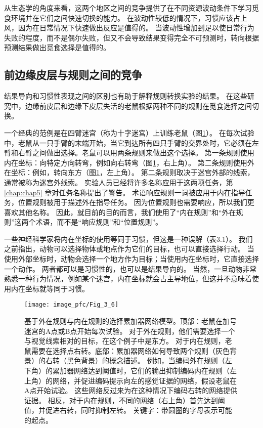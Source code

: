 从生态学的角度来看，这两个地区之间的竞争提供了在不同资源波动条件下学习觅食环境并在它们之间快速切换的能力。
在波动性较低的情况下，习惯应该占上风，因为在日常情况下快速做出反应是值得的。
当波动性增加到足以使日常行为失败的程度，而不是偶尔失败，但又不会导致结果变得完全不可预测时，转向根据预测结果做出觅食选择是值得的。\par



\subsection{前边缘皮层与规则之间的竞争}

结果导向和习惯性表现之间的区别也有助于解释规则转换实验的结果。
在这些研究中，边缘前皮层和边缘下皮层失活的老鼠根据两种不同的规则在觅食选择之间切换。\par


一个经典的范例是在四臂迷宫（称为十字迷宫）上训练老鼠（图\ref{fig:3_6}）。
在每次试验中，老鼠从一只手臂的末端开始，当它到达所有四只手臂的交界处时，它必须在左臂和右臂之间做出选择。老鼠可以用两条规则来做出这个选择。
第一条规则使用内在坐标：向特定方向转弯，例如向右转弯（图\ref{fig:3_6}，右上角）。
第二条规则使用外在坐标：例如，转向东方（图\ref{fig:3_6}，左上角）。
第二条规则取决于迷宫外部的线索，通常被称为迷宫外线索。
实验人员已经将许多名称应用于这两项任务，第 \ref{chap:chap5} 章对任务名称提出了警告。
术语响应规则一词被应用于内在指导任务，位置规则被用于描述外在指导任务。
因为位置规则也需要响应，所以我们更喜欢其他名称。
因此，就目前的目的而言，我们使用了“内在规则”和“外在规则”这两个术语，而不是“响应规则”和“位置规则”。\par


一些神经科学家将内在坐标的使用等同于习惯，但这是一种误解（表3.1）。
我们之前指出，动物可以选择物体或地点作为它们的目标，也可以直接选择行动。
当使用外部坐标时，动物会选择一个地方作为目标；当使用内在坐标时，它直接选择一个动作。
两者都可以是习惯性的，也可以是结果导向的。
当然，一旦动物非常熟悉一种行为情况，例如某个迷宫，内在坐标就会占主导地位，但这并不意味着使用内在坐标就等同于习惯。\par


\begin{figure}[!htb]
	\centering
	\texttt{[image: image\_pfc/Fig\_3\_6]}
	\caption{基于外在规则与内在规则的选择累加器网络模型。顶部：老鼠在加号迷宫的A点或B点开始每次试验。
		对于外在规则，他们需要选择一个与视觉线索相对的目标，在这个例子中是东方。
		对于内在规则，老鼠需要在选择点右转。底部：累加器网络如何导致两个规则（灰色背景）的右转（黑色背景）的概念描述。
		例如，当编码外在规则（左下角）的累加器网络达到阈值时，它们的输出抑制编码内在规则（左上角）的网络，并促进编码提示向左的感觉证据的网络，假设老鼠在A点开始试验。
		这些网络反过来为在这种情况下编码右转的网络提供证据。
		相反，对于内在规则，不同的网络（右上角）首先达到阈值，并促进右转，同时抑制左转。
		关键字：带圆圈的字母表示可能的起点。}
	\label{fig:3_6}
\end{figure}



